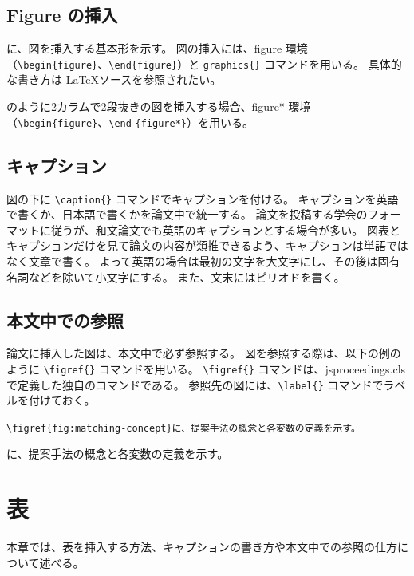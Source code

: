 \documentclass[uplatex, twocolumn, 9pt]{jsproceedings}
\begin{document}
\subsection{Figure の挿入}
に、図を挿入する基本形を示す。
図の挿入には、figure 環境（\verb*|\begin{figure}|、\verb*|\end{figure}|）と \verb*|| \verb*|graphics{}| コマンドを用いる。
具体的な書き方は \LaTeX ソースを参照されたい。

のように2カラムで2段抜きの図を挿入する場合、figure* 環境（\verb*|\begin{figure}|、\verb*|\end| \verb*|{figure*}|）を用いる。

\subsection{キャプション}
図の下に \verb*|\caption{}| コマンドでキャプションを付ける。
キャプションを英語で書くか、日本語で書くかを論文中で統一する。
論文を投稿する学会のフォーマットに従うが、和文論文でも英語のキャプションとする場合が多い。
図表とキャプションだけを見て論文の内容が類推できるよう、キャプションは単語ではなく文章で書く。
よって英語の場合は最初の文字を大文字にし、その後は固有名詞などを除いて小文字にする。
また、文末にはピリオドを書く。

\subsection{本文中での参照}
論文に挿入した図は、本文中で必ず参照する。
図を参照する際は、以下の例のように \verb*|\figref{}| コマンドを用いる。
\verb*|\figref{}| コマンドは、jsproceedings.cls で定義した独自のコマンドである。
参照先の図には、\verb*|\label{}| コマンドでラベルを付けておく。
\begin{description}[style=nextline]
  \item[\LaTeX ソース]%
  \verb|\figref{fig:matching-concept}に、提案手法の概念と各変数の定義を示す。|
  \item[出力]%
  に、提案手法の概念と各変数の定義を示す。
\end{description}


\section{表}
本章では、表を挿入する方法、キャプションの書き方や本文中での参照の仕方について述べる。
\end{document}
